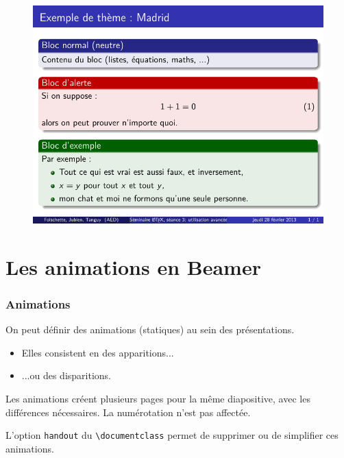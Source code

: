 \begin{frame}[plain]
\begin{figure}
  \centering
  \includegraphics[width=1\textwidth]{ppt_seance3_exblock}
\end{figure}
\end{frame}



\section{Les animations en Beamer}

\begin{frame}[fragile]
  \frametitle{Animations}

On peut définir des animations (statiques) au sein des présentations.
\begin{itemize}
  \item<2,4-> Elles consistent en des apparitions...
  \item<3-> ...ou des disparitions.
\end{itemize}

\bigskip
\pause[4]
Les animations créent plusieurs pages pour la même diapositive, avec les différences nécessaires. La numérotation n'est pas affectée.

\medskip
L'option \lstinline?handout? du \lstinline?\documentclass? permet de supprimer ou de simplifier ces animations.
\end{frame}



